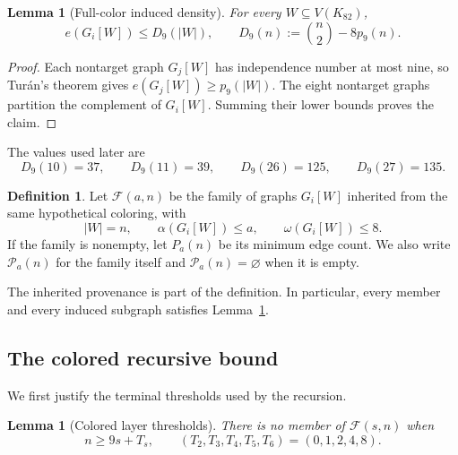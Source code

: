 \documentclass[11pt,reqno,a4paper]{amsart}
\newtheorem{lemma}[theorem]{Lemma}
\theoremstyle{definition}
\newtheorem{definition}[theorem]{Definition}
\theoremstyle{remark}
\newcommand{\cF}{\mathcal F}
\newcommand{\cP}{\mathcal P}
\begin{document}
\begin{lemma}[Full-color induced density]\label{lem:density}
For every $W\subseteq V(K_{82})$,
\[
 e(G_i[W])\le D_9(|W|),\qquad
 D_9(n):=\binom n2-8p_9(n).
\]
\end{lemma}

\begin{proof}
Each nontarget graph $G_j[W]$ has independence number at most nine, so
Tur\'an's theorem gives $e(G_j[W])\ge p_9(|W|)$. The eight nontarget
graphs partition the complement of $G_i[W]$. Summing their lower bounds
proves the claim.
\end{proof}

The values used later are
\begin{equation}\label{eq:D-values}
 D_9(10)=37,\qquad D_9(11)=39,\qquad
 D_9(26)=125,\qquad D_9(27)=135.
\end{equation}

\begin{definition}\label{def:family}
Let $\cF(a,n)$ be the family of graphs $G_i[W]$ inherited from the same
hypothetical coloring, with
\[
 |W|=n,\qquad \alpha(G_i[W])\le a,\qquad \omega(G_i[W])\le8.
\]
If the family is nonempty, let $P_a(n)$ be its minimum edge count.
We also write $\cP_a(n)$ for the family itself and
$\cP_a(n)=\varnothing$ when it is empty.
\end{definition}

The inherited provenance is part of the definition. In particular, every
member and every induced subgraph satisfies Lemma~\ref{lem:density}.

\subsection{The colored recursive bound}

We first justify the terminal thresholds used by the recursion.

\begin{lemma}[Colored layer thresholds]\label{lem:thresholds}
There is no member of $\cF(s,n)$ when
\[
 n\ge9s+T_s,\qquad
 (T_2,T_3,T_4,T_5,T_6)=(0,1,2,4,8).
\]
\end{lemma}
\end{document}
